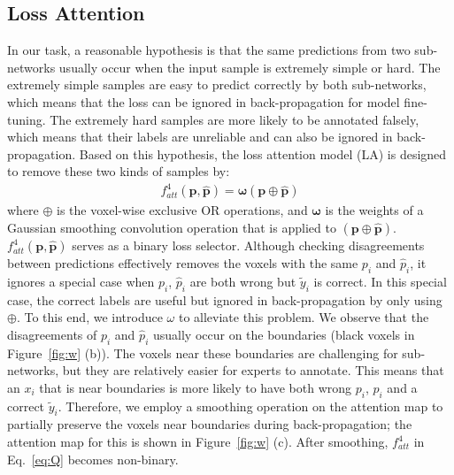 \documentclass[letterpaper]{article} %
\begin{document}
\subsection{Loss Attention}\label{sec:a}
In our task, a reasonable hypothesis is that the same predictions from two sub-networks usually occur when the input sample is extremely simple or hard.
The extremely simple samples are easy to predict correctly by both sub-networks, which means that the loss can be ignored in back-propagation for model fine-tuning.
The extremely hard samples are more likely to be annotated falsely, which means that their labels are unreliable and can also be ignored in back-propagation.
Based on this hypothesis, the loss attention model (LA) is designed to remove these two kinds of samples by:
\begin{eqnarray}\label{eq:Q}
f_{att}^4(\boldsymbol{p},\widehat{\boldsymbol{p}}) =  \bm{\omega}(\boldsymbol{p} \oplus \widehat{\boldsymbol{p}})
\end{eqnarray}
where $\oplus$ is the voxel-wise exclusive OR operations, and $\bm{\omega}$ is the weights of a Gaussian smoothing convolution operation that is applied to $(\boldsymbol{p} \oplus \widehat{\boldsymbol{p}})$.
$f_{att}^4(\boldsymbol{p},\widehat{\boldsymbol{p}})$ serves as a binary loss selector.
Although checking disagreements between predictions effectively removes the voxels with the same $p_i$ and $\widehat{p}_i$, it ignores a special case when $p_i$, $\widehat{p}_i$ are both wrong but $\widetilde{y}_i$ is correct.
In this special case, the correct labels are useful but ignored in back-propagation by only using $\oplus$.
To this end, we introduce $\omega$ to alleviate this problem.
We observe that the disagreements of  $p_i$ and $\widehat{p}_i$ usually occur on the boundaries (black voxels in Figure~\ref{fig:w} (b)).
The voxels near these boundaries are challenging for sub-networks, but they are relatively easier for experts to annotate.
This means that an $x_i$ that is near boundaries is more likely to have both wrong $p_i$, $\widehat{p}_i$ and a correct $\widetilde{y}_i$.
Therefore, we employ a smoothing operation on the attention map to partially preserve the voxels near boundaries during back-propagation; the attention map for this is shown in Figure~\ref{fig:w} (c).
After smoothing, $f_{att}^4$ in Eq.~\eqref{eq:Q} becomes non-binary.
\end{document}
